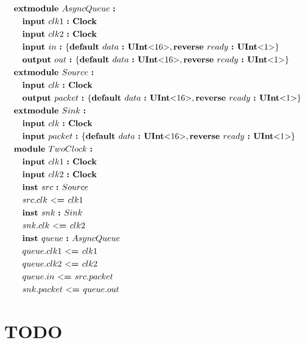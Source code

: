 \documentclass[12pt]{article}
\begin{document}
{ \fontsize{11pt}{1.15em}\selectfont
\[
\begin{aligned}
&\kw{extmodule} AsyncQueue \ \kws{:} \\
&\quad \kw{input} clk1 \ \kw{:} \kws{Clock} \\
&\quad \kw{input} clk2 \ \kw{:} \kws{Clock} \\
&\quad \kw{input} in  \ \kw{:} \bundleT{\kw{default} data \ \kw{:} \kws{UInt$<$}16\kws{$>$},\kw{reverse} ready \ \kw{:} \kws{UInt$<$}1\kws{$>$}} \\
&\quad \kw{output} out  \ \kw{:} \bundleT{\kw{default} data \ \kw{:} \kws{UInt$<$}16\kws{$>$},\kw{reverse} ready \ \kw{:} \kws{UInt$<$}1\kws{$>$}} \\
&\kw{extmodule} Source \ \kws{:} \\
&\quad \kw{input} clk \ \kw{:} \kws{Clock} \\
&\quad \kw{output} packet  \ \kw{:} \bundleT{\kw{default} data \ \kw{:} \kws{UInt$<$}16\kws{$>$},\kw{reverse} ready \ \kw{:} \kws{UInt$<$}1\kws{$>$}} \\
&\kw{extmodule} Sink \ \kws{:} \\
&\quad \kw{input} clk \ \kw{:} \kws{Clock} \\
&\quad \kw{input} packet  \ \kw{:} \bundleT{\kw{default} data \ \kw{:} \kws{UInt$<$}16\kws{$>$},\kw{reverse} ready \ \kw{:} \kws{UInt$<$}1\kws{$>$}} \\
&\kw{module} TwoClock \ \kws{:} \\
&\quad \kw{input} clk1 \ \kw{:} \kws{Clock} \\
&\quad \kw{input} clk2 \ \kw{:} \kws{Clock} \\
&\quad \kw{inst} src \ \kw{:} Source \\
&\quad src.clk \ \kw{$<$=} clk1 \\
&\quad \kw{inst} snk \ \kw{:} Sink \\
&\quad snk.clk \ \kw{$<$=} clk2 \\
&\quad \kw{inst} queue \ \kw{:} AsyncQueue \\
&\quad queue.clk1 \ \kw{$<$=} clk1 \\
&\quad queue.clk2 \ \kw{$<$=} clk2 \\
&\quad queue.in \ \kw{$<$=} src.packet \\
&\quad snk.packet \ \kw{$<$=} queue.out \\
\end{aligned}
\]
}

\section{TODO}
\end{document}
